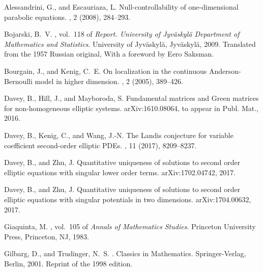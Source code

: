 \documentclass[12pt,reqno]{amsart}
\theoremstyle{plain}
\theoremstyle{definition}
\begin{document}
\def\cprime{$'$}
\begin{thebibliography}{10}

{\sc Alessandrini, G., and Escauriaza, L.}
\newblock Null-controllability of one-dimensional parabolic equations.
, 2 (2008), 284--293.

{\sc Bojarski, B.~V.}
, vol.~118
  of {\em Report. University of Jyv{\"a}skyl{\"a} Department of Mathematics and
  Statistics}.
\newblock University of Jyv{\"a}skyl{\"a}, Jyv{\"a}skyl{\"a}, 2009.
\newblock Translated from the 1957 Russian original, With a foreword by Eero
  Saksman.

{\sc Bourgain, J., and Kenig, C.~E.}
\newblock On localization in the continuous {A}nderson-{B}ernoulli model in
  higher dimension.
, 2 (2005), 389--426.

{\sc Davey, B., Hill, J., and Mayboroda, S.}
\newblock Fundamental matrices and {G}reen matrices for non-homogeneous
  elliptic systems.
\newblock arXiv:1610.08064, to appear in Publ. Mat., 2016.

{\sc Davey, B., Kenig, C., and Wang, J.-N.}
\newblock The {L}andis conjecture for variable coefficient second-order
  elliptic {PDE}s.
, 11 (2017), 8209--8237.

{\sc Davey, B., and Zhu, J.}
\newblock Quantitative uniqueness of solutions to second order elliptic
  equations with singular lower order terms.
\newblock arXiv:1702.04742, 2017.

{\sc Davey, B., and Zhu, J.}
\newblock Quantitative uniqueness of solutions to second order elliptic
  equations with singular potentials in two dimensions.
\newblock arXiv:1704.00632, 2017.

{\sc Giaquinta, M.}
, vol.~105 of {\em Annals of Mathematics Studies}.
\newblock Princeton University Press, Princeton, NJ, 1983.

{\sc Gilbarg, D., and Trudinger, N.~S.}
.
\newblock Classics in Mathematics. Springer-Verlag, Berlin, 2001.
\newblock Reprint of the 1998 edition.


\end{thebibliography}
\end{document}
